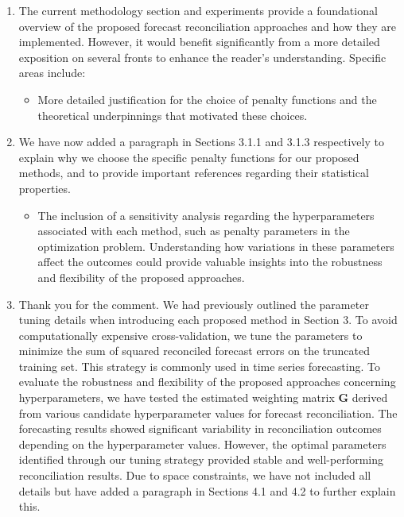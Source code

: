 \documentclass[11pt,a4paper,]{article}
\providecommand{\tightlist}{%
  \setlength{\itemsep}{0pt}\setlength{\parskip}{0pt}}
\renewenvironment{quote}
               {\list{}{\rightmargin\leftmargin}%
                \item\relax\color[RGB]{0,150,0}}
               {\endlist}
\begin{document}
\begin{enumerate}
\def\labelenumi{\arabic{enumi}.}
\setcounter{enumi}{5}
\item
  The current methodology section and experiments provide a foundational
  overview of the proposed forecast reconciliation approaches and how
  they are implemented. However, it would benefit significantly from a
  more detailed exposition on several fronts to enhance the reader's
  understanding. Specific areas include:

  \begin{itemize}
  \tightlist
  \item
    More detailed justification for the choice of penalty functions and
    the theoretical underpinnings that motivated these choices.
  \end{itemize}

  \begin{quote}
  We have now added a paragraph in Sections 3.1.1 and 3.1.3 respectively
  to explain why we choose the specific penalty functions for our
  proposed methods, and to provide important references regarding their
  statistical properties.
  \end{quote}

  \begin{itemize}
  \tightlist
  \item
    The inclusion of a sensitivity analysis regarding the
    hyperparameters associated with each method, such as penalty
    parameters in the optimization problem. Understanding how variations
    in these parameters affect the outcomes could provide valuable
    insights into the robustness and flexibility of the proposed
    approaches.
  \end{itemize}

  \begin{quote}
  Thank you for the comment. We had previously outlined the parameter
  tuning details when introducing each proposed method in Section 3. To
  avoid computationally expensive cross-validation, we tune the
  parameters to minimize the sum of squared reconciled forecast errors
  on the truncated training set. This strategy is commonly used in time
  series forecasting. To evaluate the robustness and flexibility of the
  proposed approaches concerning hyperparameters, we have tested the
  estimated weighting matrix \(\bm{G}\) derived from various candidate
  hyperparameter values for forecast reconciliation. The forecasting
  results showed significant variability in reconciliation outcomes
  depending on the hyperparameter values. However, the optimal
  parameters identified through our tuning strategy provided stable and
  well-performing reconciliation results. Due to space constraints, we
  have not included all details but have added a paragraph in Sections
  4.1 and 4.2 to further explain this.
  \end{quote}
\end{enumerate}
\end{document}
